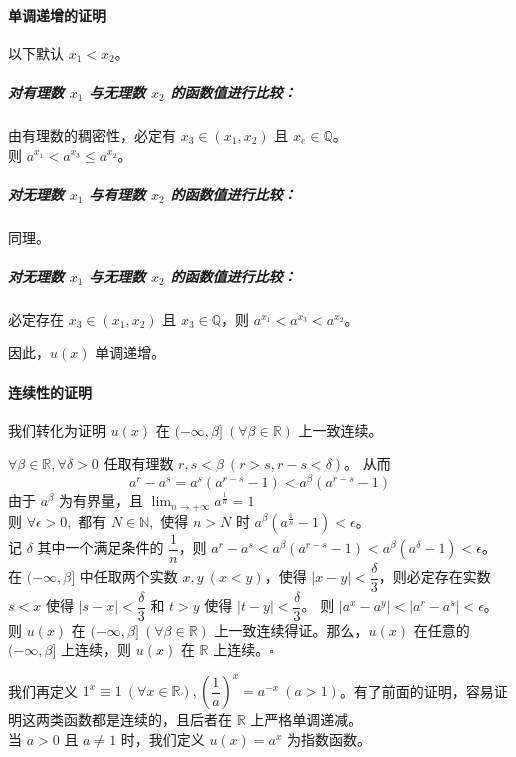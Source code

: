 \documentclass[UTF8,12pt]{ctexart}
\begin{document}
        \paragraph{单调递增的证明} 以下默认 $x_1 < x_2$。
            \subparagraph{对有理数 $x_1$ 与无理数 $x_2$ 的函数值进行比较：}
                由有理数的稠密性，必定有 $x_3 \in (x_1, x_2)$ 且 $x_e \in \mathbb Q$。\\
                则 $a^{x_1} < a^{x_3} \leq a^{x_2}$。
            \subparagraph{对无理数 $x_1$ 与有理数 $x_2$ 的函数值进行比较：}同理。
            \subparagraph{对无理数 $x_1$ 与无理数 $x_2$ 的函数值进行比较：}
                必定存在 $x_3 \in (x_1, x_2)$ 且 $x_3 \in \mathbb Q$，则 $a^{x_1} < a^{x_3} < a^{x_2}$。
            
            因此，$u(x)$ 单调递增。
        \paragraph{连续性的证明}
            我们转化为证明 $u(x)$ 在 $(-\infty, \beta]\ (\forall \beta \in \mathbb R)$ 上一致连续。

            $\forall \beta \in \mathbb R, \forall \delta > 0$ 任取有理数 $r, s < \beta\ (r > s, r - s < \delta)$。
            从而 $$
            a^r - a^s = a^s(a^{r - s} - 1) < a^\beta (a^{r - s} - 1)
            $$
            由于 $a^\beta$ 为有界量，且 $\lim_{n \to +\infty} a^{\frac 1 n} = 1$\\
            则 $\forall \epsilon > 0, $ 都有 $N \in \mathbb N,$ 使得 $n > N$ 时 $a^\beta (a^{\frac 1 n} - 1) < \epsilon$。\\
            记 $\delta$ 其中一个满足条件的 $\dfrac 1 n$，则 $a^r - a^s < a^\beta (a^{r - s} - 1) < a^\beta (a^\delta - 1) < \epsilon$。\\
            在 $(-\infty, \beta]$ 中任取两个实数 $x, y\ (x < y)$，使得 $|x - y| < \dfrac{\delta}{3}$，则必定存在实数 $s < x$ 使得 $|s - x| < \dfrac{\delta}{3}$ 和 $t > y$ 使得 $|t - y| < \dfrac{\delta}{3}$。
            则 $|a^x - a^y| < |a^r - a^s| < \epsilon$。\\
            则 $u(x)$ 在 $(-\infty, \beta]\ (\forall \beta \in \mathbb R)$ 上一致连续得证。那么，$u(x)$ 在任意的 $(-\infty, \beta]$ 上连续，则 $u(x)$ 在 $\mathbb R$ 上连续。$\square$

        我们再定义 $1^x \equiv 1\ (\forall x \in \mathbb R), (\dfrac 1 a)^x = a^{-x}\ (a > 1)$。有了前面的证明，容易证明这两类函数都是连续的，且后者在 $\mathbb R$ 上严格单调递减。\\
        当 $a > 0$ 且 $a \neq 1$ 时，我们定义 $u(x) = a^x$ 为指数函数。
\end{document}
